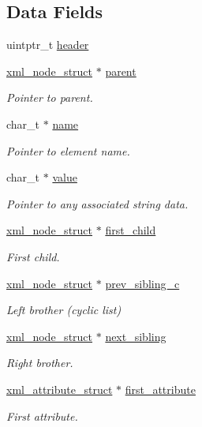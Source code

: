 \subsection*{Data Fields}
\begin{DoxyCompactItemize}
\item 
uintptr\-\_\-t \hyperlink{structpugi_1_1xml__node__struct_aea2e405a368dc5a278a2d23465f1975c}{header}
\item 
\hyperlink{structpugi_1_1xml__node__struct}{xml\-\_\-node\-\_\-struct} $\ast$ \hyperlink{structpugi_1_1xml__node__struct_af692c222bcc5a9f61108cb3ae0b7b5ea}{parent}
\begin{DoxyCompactList}\small\item\em Pointer to parent. \end{DoxyCompactList}\item 
char\-\_\-t $\ast$ \hyperlink{structpugi_1_1xml__node__struct_ae2324fdbd1e307fb12007d1d0f957a0b}{name}
\begin{DoxyCompactList}\small\item\em Pointer to element name. \end{DoxyCompactList}\item 
char\-\_\-t $\ast$ \hyperlink{structpugi_1_1xml__node__struct_a191e708864fccda17bb66157afdadd2d}{value}
\begin{DoxyCompactList}\small\item\em Pointer to any associated string data. \end{DoxyCompactList}\item 
\hyperlink{structpugi_1_1xml__node__struct}{xml\-\_\-node\-\_\-struct} $\ast$ \hyperlink{structpugi_1_1xml__node__struct_af72c49a0f81928ef664d9d2f0260f23d}{first\-\_\-child}
\begin{DoxyCompactList}\small\item\em First child. \end{DoxyCompactList}\item 
\hyperlink{structpugi_1_1xml__node__struct}{xml\-\_\-node\-\_\-struct} $\ast$ \hyperlink{structpugi_1_1xml__node__struct_a74e62128c88c422c0ed969633bbb2d4e}{prev\-\_\-sibling\-\_\-c}
\begin{DoxyCompactList}\small\item\em Left brother (cyclic list) \end{DoxyCompactList}\item 
\hyperlink{structpugi_1_1xml__node__struct}{xml\-\_\-node\-\_\-struct} $\ast$ \hyperlink{structpugi_1_1xml__node__struct_acf0867e3a77871e37132046d97398a6d}{next\-\_\-sibling}
\begin{DoxyCompactList}\small\item\em Right brother. \end{DoxyCompactList}\item 
\hyperlink{structpugi_1_1xml__attribute__struct}{xml\-\_\-attribute\-\_\-struct} $\ast$ \hyperlink{structpugi_1_1xml__node__struct_a482d2daf97ce0745661cb2c57d8f6fb3}{first\-\_\-attribute}
\begin{DoxyCompactList}\small\item\em First attribute. \end{DoxyCompactList}\end{DoxyCompactItemize}



